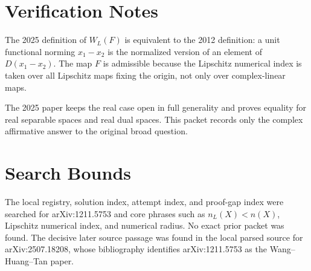 \documentclass[11pt]{article}
\begin{document}
\section*{Verification Notes}

The 2025 definition of \(W_L(F)\) is equivalent to the 2012 definition: a
unit functional norming \(x_1-x_2\) is the normalized version of an element of
\(D(x_1-x_2)\).  The map \(F\) is admissible because the Lipschitz numerical
index is taken over all Lipschitz maps fixing the origin, not only over
complex-linear maps.

The 2025 paper keeps the real case open in full generality and proves equality
for real separable spaces and real dual spaces.  This packet records only the
complex affirmative answer to the original broad question.

\section*{Search Bounds}

The local registry, solution index, attempt index, and proof-gap index were
searched for arXiv:1211.5753 and core phrases such as \(n_L(X)<n(X)\),
Lipschitz numerical index, and numerical radius.  No exact prior packet was
found.  The decisive later source passage was found in the local parsed source
for arXiv:2507.18208, whose bibliography identifies arXiv:1211.5753 as the
Wang--Huang--Tan paper.
\end{document}
